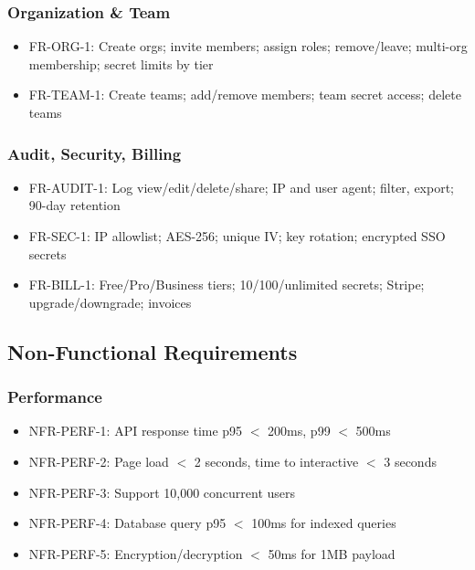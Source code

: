 \documentclass[12pt,a4paper]{article}
\begin{document}
\subsubsection{Organization \& Team}
\begin{itemize}[leftmargin=*, itemsep=0.1em]
  \item FR-ORG-1: Create orgs; invite members; assign roles; remove/leave; multi-org membership; secret limits by tier
  \item FR-TEAM-1: Create teams; add/remove members; team secret access; delete teams
\end{itemize}

\subsubsection{Audit, Security, Billing}
\begin{itemize}[leftmargin=*, itemsep=0.1em]
  \item FR-AUDIT-1: Log view/edit/delete/share; IP and user agent; filter, export; 90-day retention
  \item FR-SEC-1: IP allowlist; AES-256; unique IV; key rotation; encrypted SSO secrets
  \item FR-BILL-1: Free/Pro/Business tiers; 10/100/unlimited secrets; Stripe; upgrade/downgrade; invoices
\end{itemize}

\subsection{Non-Functional Requirements}

\subsubsection{Performance}
\begin{itemize}[leftmargin=*, itemsep=0.1em]
  \item NFR-PERF-1: API response time p95 $<$ 200ms, p99 $<$ 500ms
  \item NFR-PERF-2: Page load $<$ 2 seconds, time to interactive $<$ 3 seconds
  \item NFR-PERF-3: Support 10,000 concurrent users
  \item NFR-PERF-4: Database query p95 $<$ 100ms for indexed queries
  \item NFR-PERF-5: Encryption/decryption $<$ 50ms for 1MB payload
\end{itemize}
\end{document}
